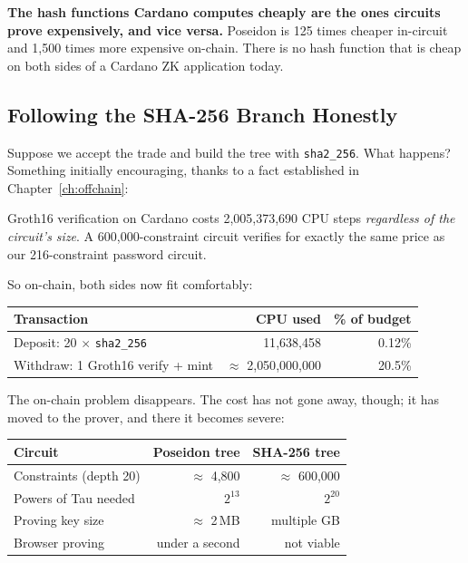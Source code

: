 \begin{highlight}
\textbf{The hash functions Cardano computes cheaply are the ones circuits prove
expensively, and vice versa.} Poseidon is 125 times cheaper in-circuit and
1{,}500 times more expensive on-chain. There is no hash function that is cheap
on both sides of a Cardano ZK application today.
\end{highlight}

\subsection*{Following the SHA-256 Branch Honestly}

Suppose we accept the trade and build the tree with \texttt{sha2\_256}. What
happens? Something initially encouraging, thanks to a fact established in
Chapter~\ref{ch:offchain}:

\begin{outline}
Groth16 verification on Cardano costs 2{,}005{,}373{,}690 CPU steps
\emph{regardless of the circuit's size}. A 600{,}000-constraint circuit verifies
for exactly the same price as our 216-constraint password circuit.
\end{outline}

So on-chain, both sides now fit comfortably:

\begin{center}
\begin{tabular}{lrr}
  \hline
  \textbf{Transaction} & \textbf{CPU used} & \textbf{\% of budget} \\
  \hline
  Deposit: 20 $\times$ \texttt{sha2\_256} & 11{,}638{,}458 & 0.12\% \\
  Withdraw: 1 Groth16 verify + mint       & $\approx$ 2{,}050{,}000{,}000 & 20.5\% \\
  \hline
\end{tabular}
\end{center}

The on-chain problem disappears. The cost has not gone away, though; it has
moved to the prover, and there it becomes severe:

\begin{center}
\begin{tabular}{lrr}
  \hline
  \textbf{Circuit} & \textbf{Poseidon tree} & \textbf{SHA-256 tree} \\
  \hline
  Constraints (depth 20)   & $\approx$ 4{,}800 & $\approx$ 600{,}000 \\
  Powers of Tau needed     & $2^{13}$          & $2^{20}$ \\
  Proving key size         & $\approx$ 2\,MB   & multiple GB \\
  Browser proving          & under a second    & not viable \\
  \hline
\end{tabular}
\end{center}

